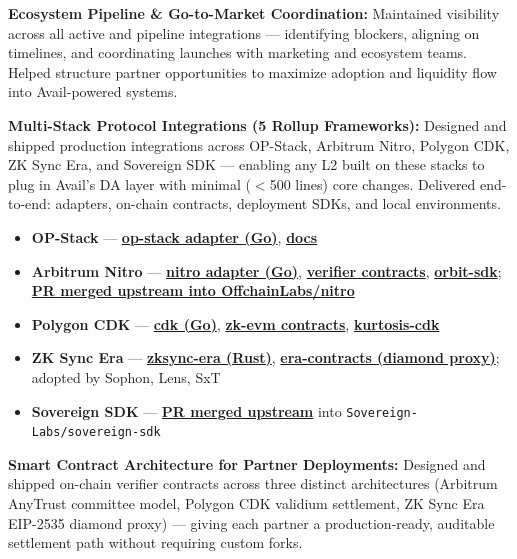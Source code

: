 \documentclass[letterpaper,11pt]{article}
\newcommand{\resumeItem}[1]{
  \item\small{{#1 \vspace{-2pt}}}
}
\begin{document}
    \resumeItem{\textbf{Ecosystem Pipeline \& Go-to-Market Coordination:} Maintained visibility across all active and pipeline integrations — identifying blockers, aligning on timelines, and coordinating launches with marketing and ecosystem teams. Helped structure partner opportunities to maximize adoption and liquidity flow into Avail-powered systems.}

    \resumeItem{\textbf{Multi-Stack Protocol Integrations (5 Rollup Frameworks):} Designed and shipped production integrations across OP-Stack, Arbitrum Nitro, Polygon CDK, ZK Sync Era, and Sovereign SDK — enabling any L2 built on these stacks to plug in Avail's DA layer with minimal ($<$500 lines) core changes. Delivered end-to-end: adapters, on-chain contracts, deployment SDKs, and local environments.}
    \begin{itemize}
      \item \textbf{OP-Stack} — \href{https://github.com/availproject/avail-op-stack-adapter}{\textbf{op-stack adapter (Go)}}, \href{https://docs.availproject.org/docs/build-with-avail/deploy-rollup-on-avail/Optimium/op-stack/op-stack}{\textbf{docs}}
      \item \textbf{Arbitrum Nitro} — \href{https://github.com/availproject/avail-nitro-adapter}{\textbf{nitro adapter (Go)}}, \href{https://github.com/availproject/nitro-contracts}{\textbf{verifier contracts}}, \href{https://github.com/availproject/arbitrum-orbit-sdk}{\textbf{orbit-sdk}}; \href{https://github.com/OffchainLabs/nitro/pull/2666}{\textbf{PR merged upstream into OffchainLabs/nitro}}
      \item \textbf{Polygon CDK} — \href{https://github.com/availproject/cdk}{\textbf{cdk (Go)}}, \href{https://github.com/availproject/cdk-zkevm-contracts}{\textbf{zk-evm contracts}}, \href{https://github.com/availproject/kurtosis-cdk}{\textbf{kurtosis-cdk}}
      \item \textbf{ZK Sync Era} — \href{https://github.com/availproject/zksync-era}{\textbf{zksync-era (Rust)}}, \href{https://github.com/availproject/era-contracts}{\textbf{era-contracts (diamond proxy)}}; adopted by Sophon, Lens, SxT
      \item \textbf{Sovereign SDK} — \href{https://github.com/Sovereign-Labs/sovereign-sdk/pull/1709}{\textbf{PR merged upstream}} into \texttt{Sovereign-Labs/sovereign-sdk}
    \end{itemize}

    \resumeItem{\textbf{Smart Contract Architecture for Partner Deployments:} Designed and shipped on-chain verifier contracts across three distinct architectures (Arbitrum AnyTrust committee model, Polygon CDK validium settlement, ZK Sync Era EIP-2535 diamond proxy) — giving each partner a production-ready, auditable settlement path without requiring custom forks.}
\end{document}
